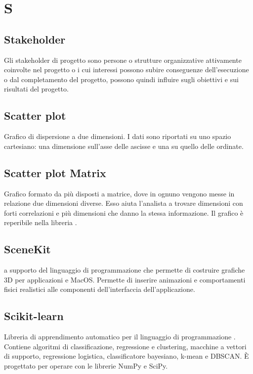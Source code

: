 \section*{S}
\markright{}

\subsection*{Stakeholder}
Gli stakeholder di progetto sono persone o strutture organizzative attivamente coinvolte nel progetto o i cui interessi possono subire conseguenze dell'esecuzione o dal completamento del progetto, possono quindi influire sugli obiettivi e sui risultati del progetto.

\subsection*{Scatter plot}
Grafico di dispersione a due dimensioni. I dati sono riportati su uno spazio cartesiano: una dimensione sull'asse delle ascisse e una su quello delle ordinate. 

\subsection*{Scatter plot Matrix}
Grafico formato da più  disposti a matrice, dove in ognuno vengono messe in relazione due dimensioni diverse. Esso aiuta l'analista a trovare dimensioni con forti correlazioni e più  dimensioni che danno la stessa informazione. Il grafico è reperibile nella libreria .

\subsection*{SceneKit}
 a supporto del linguaggio di programmazione  che permette di costruire grafiche 3D per applicazioni  e MacOS. Permette di inserire animazioni e comportamenti fisici realistici alle componenti dell'interfaccia dell'applicazione. 

\subsection*{Scikit-learn}
Libreria  di apprendimento automatico per il linguaggio di programmazione . Contiene algoritmi di classificazione, regressione e clustering, macchine a vettori di supporto, regressione logistica, classificatore bayesiano, k-mean e DBSCAN. È progettato per operare con le librerie NumPy e SciPy. 

